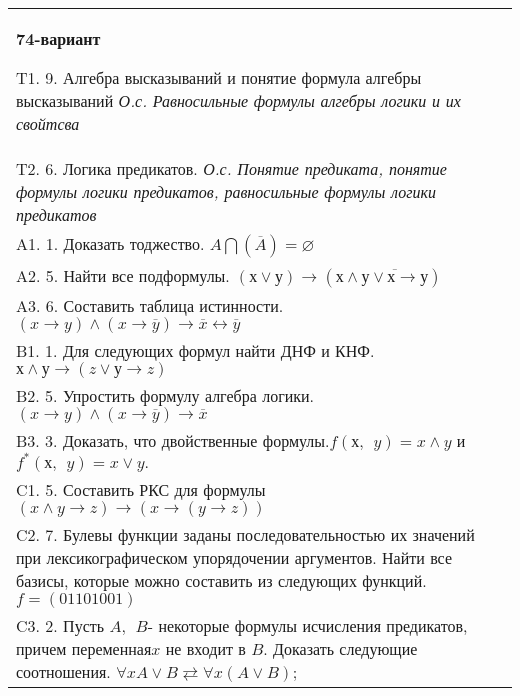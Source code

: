 \documentclass{article}
\begin{document}
\begin{tabular}{m{17cm}}
\textbf{74-вариант}
\newline

T1. 9. Алгебра высказываний и понятие формула алгебры высказываний \emph{О.с. Равносильные формулы алгебры логики и их свойтсва} \\
T2. 6. Логика предикатов. \emph{О.с. Понятие предиката, понятие формулы логики предикатов, равносильные формулы логики предикатов} \\
A1. 1. Доказать тоджество. \(A\bigcap(\overline{A}) = \varnothing\) \\
A2. 5. Найти все подформулы. \((х \vee у) \rightarrow \left( х \land \overline{у \vee х \rightarrow у} \right)\) \\
A3. 6. Составить таблица истинности. \((x \rightarrow y) \land (x \rightarrow \overline{y}) \rightarrow \overline{x} \leftrightarrow \overline{y}\) \\
B1. 1. Для следующих формул найти ДНФ и КНФ. \(х \land у \rightarrow (z \vee у \rightarrow z)\) \\
B2. 5. Упростить формулу алгебра логики. \((x \rightarrow y) \land (x \rightarrow \overline{y}) \rightarrow \overline{x}\) \\
B3. 3. Доказать, что двойственные формулы.\(f(х,\ \ y) = x \land y\) и \(f^{*}(х,\ \ y) = x \vee y.\) \\
C1. 5. Составить РКС для формулы \((x \land y \rightarrow z) \rightarrow (x \rightarrow (y \rightarrow z))\) \\
C2. 7. Булевы функции заданы последовательностью их значений при лексикографическом упорядочении аргументов. Найти все базисы, которые можно составить из следующих функций. \(f = (01101001)\) \\
C3. 2. Пусть \(A,\ \ B\)- некоторые формулы исчисления предикатов, причем переменная\(x\) не входит в \(B\). Доказать следующие соотношения. \(\forall xA \vee B \rightleftarrows \forall x(A \vee B)\); \\

\end{tabular}
\vspace{1cm}
\end{document}
